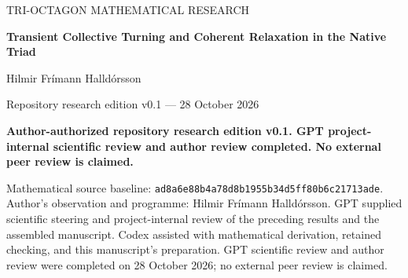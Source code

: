 \documentclass[11pt,a4paper]{article}
\numberwithin{equation}{section}
\theoremstyle{remark}\newtheorem{remark}[theorem]{Remark}
\newcommand{\pin}{ad8a6e88b4a78d8b1955b34d5ff80b6c21713ade}
\begin{document}
\hypersetup{pageanchor=false}
\begin{titlepage}
\vspace*{8mm}
{\small\color{MidnightBlue} TRI-OCTAGON MATHEMATICAL RESEARCH\par}
\vspace{7mm}
{\LARGE\bfseries Transient Collective Turning and Coherent Relaxation in the Native Triad\par}
\vspace{7mm}
{\large Hilmir Fr\'imann Halld\'orsson\par}
\vspace{3mm}
{\normalsize Repository research edition v0.1 --- 28 October 2026\par}
\vspace{5mm}
{\small\bfseries Author-authorized repository research edition v0.1. GPT project-internal scientific review and author review completed. No external peer review is claimed.\par}
\vspace{5mm}
\begin{abstract}
We synthesize a completed bounded investigation of the existing native Tri-Octagon recurrence. A retained, rigorously enclosed two-step example shows that the complex channel mean can turn while an amplitude ratio changes. An exact matched comparison with synchronization disabled then isolates delayed graph influence: graph redistribution cancels from the first mean step but changes the second through the nonlinear onsite response. Its dependence on graph strength is an exact cubic polynomial. At the prescribed comparison point the second increment changes direction even though the signed-turn statistic decreases. Separately, for the full ordered map at the same nonzero synchronization strength, an explicit annulus-and-sector domain is invariant. Ordinary phase separations contract; dispersion obeys a contraction-with-mismatch estimate; and every state in that domain converges to a unique positive unequal amplitude profile in a specified cube, up to an initial-state-dependent limiting common phase. The mean settles, residual amplitude spread is positive, and the signed-area observables decay to zero. The turning entrance lies outside this domain, so these results do not establish a single trajectory that turns, enters the domain, and settles. We distinguish the author's uncertain historical recollection, exact algebra, analytical proofs, retained computational certificates, and mathematical comparisons with physical force laws. No new simulation, root solve, kernel change, or physical identification is used.
\end{abstract}
\vfill
{\small Mathematical source baseline: \nolinkurl{\pin}.\\
Author's observation and programme: Hilmir Fr\'imann Halld\'orsson. GPT supplied scientific steering and project-internal review of the preceding results and the assembled manuscript. Codex assisted with mathematical derivation, retained checking, and this manuscript's preparation. GPT scientific review and author review were completed on 28 October 2026; no external peer review is claimed.}
\end{titlepage}
\end{document}
